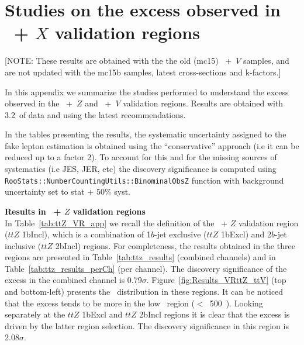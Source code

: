 \clearpage 
\section{Studies on the excess observed in \ttbar\ + $X$ validation regions}
[NOTE: These results are obtained with the the old (mc15) \ttbar~+~$V$ samples, and are not updated with the mc15b samples, latest cross-sections and k-factors.]
\label{appendix:ttV}

In this appendix we summarize the studies performed to understand the excess observed in the \ttbar~+~$Z$ and \ttbar~+~$V$ validation regions. Results are obtained with 3.2~\ifb of data and using the latest recommendations.

In the tables presenting the results, the systematic uncertainty assigned to the fake lepton estimation is obtained using the ``conservative'' approach (i.e it can be reduced up to a factor 2). To account for this and for the missing sources of systematics (i.e JES, JER, etc) the discovery significance is computed using {\tt RooStats::NumberCountingUtils::BinominalObsZ} function with background uncertainty set to stat + 50\% syst. 
 
\par{\bf Results in \ttbar\ + $Z$ validation regions\\}
In Table~\ref{tab:ttZ_VR_app} we recall the definition of the \ttbar\ + $Z$ validation region ($ttZ$ 1bIncl), which is a combination of 1$b$-jet exclusive ($ttZ$ 1bExcl) and 2$b$-jet inclusive ($ttZ$ 2bIncl) regions. For completeness, the results obtained in the three regions are presented in Table~\ref{tab:ttz_results} (combined channels) and in Table~\ref{tab:ttz_results_perCh} (per channel). The discovery significance of the excess in the combined channel is 0.79$\sigma$. Figure~\ref{fig:Results_VRttZ_ttV} (top and bottom-left) presents the \meff\ distribution in these regions. It can be noticed that the excess tends to be more in the low \meff\ region ($<$~500~\GeV). Looking separately at the $ttZ$ 1bExcl and $ttZ$ 2bIncl regions it is clear that the excess is driven by the latter region selection. The discovery significance in this region is 2.08$\sigma$. 

